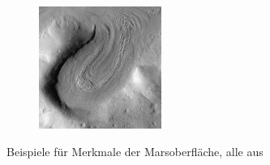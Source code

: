 \begin{figure}[h]
\begin{subfigure}[t]{0.35\textwidth}
		\captionsetup{format=plain}
		\label{fig:ex_graben}
	\end{subfigure}
	\hfill
	\begin{subfigure}[t]{0.3\textwidth}
		\centering
		\includegraphics[height=4cm,keepaspectratio]{images/Gre13_05.jpg}
		\captionsetup{format=plain}
		\label{fig:ex_glacier}
	\end{subfigure}
	\hfill
	\begin{subfigure}[t]{0.25\textwidth}
		\hfill
	\end{subfigure}
	\caption{Beispiele für Merkmale der Marsoberfläche, alle aus \cite[Kap.~7]{greeley_13}}
\end{figure}

